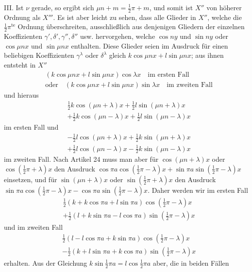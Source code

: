 III. Ist $\nu$ gerade, so ergibt sich $\mu n+m=\tfrac12\pi+m$, und somit ist $X''$ von höherer Ordnung
als $X'''$. Es ist aber leicht zu sehen, dass alle Glieder in $X''$, welche die
$\tfrac12\pi^{\mathrm{te}}$ Ordnung überschreiten, ausschließlich aus denjenigen Gliedern der einzelnen
Koeffizienten $\gamma',\delta',\gamma'',\delta''$ usw. hervorgehen, welche $\cos ny$ und
$\sin ny$ oder $\cos\mu nx$ und $\sin\mu nx$ enthalten. Diese Glieder seien im Ausdruck für
einen beliebigen Koeffizienten $\gamma^\lambda$ oder $\delta^\lambda$ gleich $k\cos\mu nx+l\sin\mu nx$;
aus ihnen entsteht in $X''$
\[
\begin{aligned}
&(k\cos\mu nx+l\sin\mu nx)\cos\lambda x\quad\text{im ersten Fall}\\[5pt]
&\text{oder}\quad(k\cos\mu nx+l\sin\mu nx)\sin\lambda x\quad\text{im zweiten Fall}
\end{aligned}
\]
und hieraus
\[
\begin{aligned}
&\tfrac12k\cos(\mu n+\lambda)x+\tfrac12l\sin(\mu n+\lambda)x\\[5pt]
&+\tfrac12k\cos(\mu n-\lambda)x+\tfrac12l\sin(\mu n-\lambda)x
\end{aligned}
\]
im ersten Fall und
\[
\begin{aligned}
&-\tfrac12l\cos(\mu n+\lambda)x+\tfrac12k\sin(\mu n+\lambda)x\\[5pt]
&+\tfrac12l\cos(\mu n-\lambda)x-\tfrac12k\sin(\mu n-\lambda)x
\end{aligned}
\]
im zweiten Fall. Nach Artikel 24 muss man aber für $\cos(\mu n+\lambda)x$
oder $\cos(\tfrac12\pi+\lambda)x$ den Ausdruck $\cos\pi a\cos(\tfrac12\pi-\lambda)x+\sin\pi a\sin(\tfrac12\pi-\lambda)x$ einsetzen,
und für $\sin(\mu n+\lambda)x$ oder $\sin(\tfrac12\pi+\lambda)x$ den Ausdruck
$\sin\pi a\cos(\tfrac12\pi-\lambda)x-\cos\pi a\sin(\tfrac12\pi-\lambda)x$.
Daher werden wir im ersten Fall
\[
\begin{aligned}
&\tfrac12(k+k\cos\pi a+l\sin\pi a)\cos(\tfrac12\pi-\lambda)x\\[5pt]
&+\tfrac12(l+k\sin\pi a-l\cos\pi a)\sin(\tfrac12\pi-\lambda)x
\end{aligned}
\]
und im zweiten Fall
\[
\begin{aligned}
&\tfrac12(l-l\cos\pi a+k\sin\pi a)\cos(\tfrac12\pi-\lambda)x\\[5pt]
&-\tfrac12(k+l\sin\pi a+k\cos\pi a)\sin(\tfrac12\pi-\lambda)x
\end{aligned}
\]
erhalten. Aus der Gleichung $k\sin\tfrac12\pi a=l\cos\tfrac12\pi a$ aber, die in beiden Fällen
